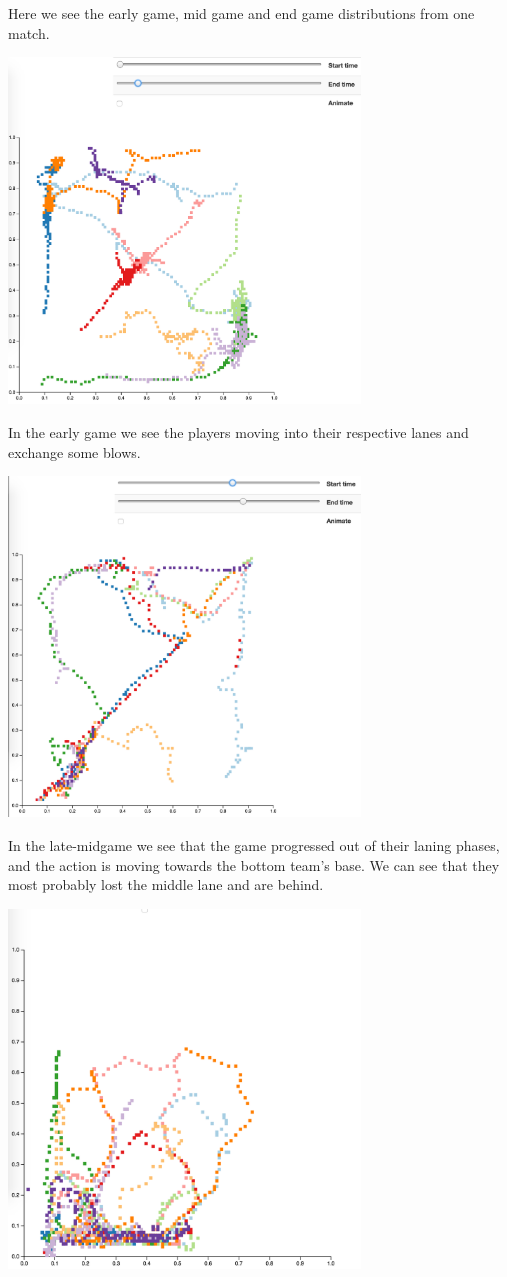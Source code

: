 Here we see the early game, mid game and end game distributions from one match.

\includegraphics[width=0.7\textwidth]{earlygame}

In the early game we see the players moving into their respective lanes and exchange some blows.

\includegraphics[width=0.7\textwidth]{midgame}

In the late-midgame we see that the game progressed out of their laning phases, and the action is moving towards the bottom team's base. We can see that they most probably lost the middle lane and are behind.

\includegraphics[width=0.7\textwidth]{lategame}

